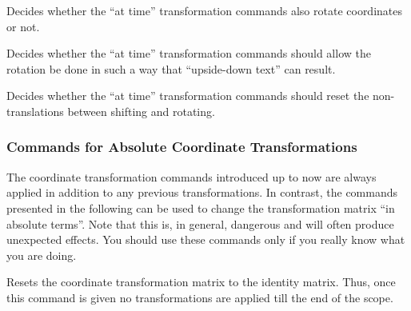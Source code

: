{
    \let\ifpgfslopedattime=\relax
    \begin{textoken}{\ifpgfslopedattime}
        Decides whether the ``at time'' transformation commands also rotate
        coordinates or not.
    \end{textoken}
}
{
    \let\ifpgfallowupsidedownattime=\relax
    \begin{textoken}{\ifpgfallowupsidedownattime}
        Decides whether the ``at time'' transformation commands should allow
        the rotation be done in such a way that ``upside-down text'' can
        result.
    \end{textoken}
}
{
    \let\ifpgfresetnontranslationsattime=\relax
    \begin{textoken}{\ifpgfresetnontranslationsattime}
        Decides whether the ``at time'' transformation commands should reset
        the non-translations between shifting and rotating.
    \end{textoken}
}


\subsubsection{Commands for Absolute Coordinate Transformations}

The coordinate transformation commands introduced up to now are always applied
in addition to any previous transformations. In contrast, the commands
presented in the following can be used to change the transformation matrix ``in
absolute terms''. Note that this is, in general, dangerous and will often
produce unexpected effects. You should use these commands only if you really
know what you are doing.

\begin{command}{\pgftransformreset}
    Resets the coordinate transformation matrix to the identity matrix. Thus,
    once this command is given no transformations are applied till the end of
    the scope.
\begin{codeexample}[]
\end{codeexample}
\end{command}

